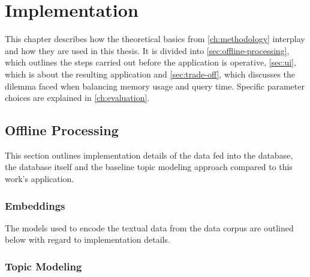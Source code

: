 \chapter{Implementation}\label{ch:implementation}

This chapter describes how the theoretical basics from \autoref{ch:methodology} interplay and how they are used in this thesis.
It is divided into \autoref{sec:offline-processing}, which outlines the steps carried out before the application is operative, 
\autoref{sec:ui}, which is about the resulting application and \autoref{sec:trade-off}, which discusses the dilemma faced when balancing memory usage and query time. 
Specific parameter choices are explained in \autoref{ch:evaluation}.


\section{Offline Processing}\label{sec:offline-processing}
This section outlines implementation details of the data fed into the database, the database itself and the baseline topic modeling approach compared to this work's application.




\subsection{Embeddings}\label{subsec:impl-embeddings}
The models used to encode the textual data from the data corpus are outlined below with regard to implementation details.















\subsection{Topic Modeling}\label{impl-topic-modeling}


